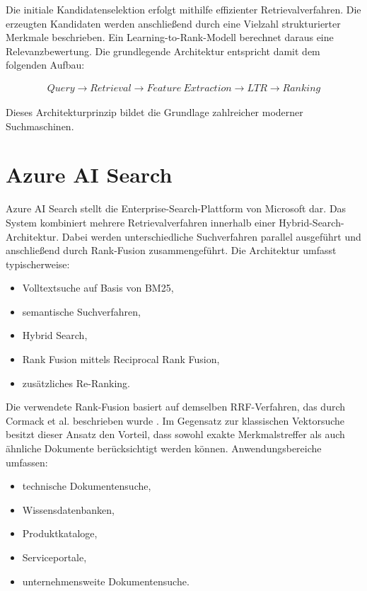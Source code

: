 Die initiale Kandidatenselektion erfolgt mithilfe effizienter Retrievalverfahren.
Die erzeugten Kandidaten werden anschließend durch eine Vielzahl strukturierter Merkmale beschrieben.
Ein Learning-to-Rank-Modell berechnet daraus eine Relevanzbewertung.
Die grundlegende Architektur entspricht damit dem folgenden Aufbau:

\begin{align}
  Query \rightarrow Retrieval \rightarrow Feature\ Extraction \rightarrow LTR \rightarrow Ranking
\end{align}

Dieses Architekturprinzip bildet die Grundlage zahlreicher moderner Suchmaschinen.

\section{Azure AI Search}

Azure AI Search stellt die Enterprise-Search-Plattform von Microsoft dar.
Das System kombiniert mehrere Retrievalverfahren innerhalb einer Hybrid-Search-Architektur.
Dabei werden unterschiedliche Suchverfahren parallel ausgeführt und anschließend durch Rank-Fusion zusammengeführt.
Die Architektur umfasst typischerweise:

\begin{itemize}
  \item Volltextsuche auf Basis von BM25,
  \item semantische Suchverfahren,
  \item Hybrid Search,
  \item Rank Fusion mittels Reciprocal Rank Fusion,
  \item zusätzliches Re-Ranking.
\end{itemize}

Die verwendete Rank-Fusion basiert auf demselben RRF-Verfahren, das durch Cormack et al. beschrieben wurde \cite{cormack2009rrf}.
Im Gegensatz zur klassischen Vektorsuche besitzt dieser Ansatz den Vorteil, dass sowohl exakte Merkmalstreffer als auch ähnliche Dokumente berücksichtigt werden können.
Anwendungsbereiche umfassen:

\begin{itemize}
  \item technische Dokumentensuche,
  \item Wissensdatenbanken,
  \item Produktkataloge,
  \item Serviceportale,
  \item unternehmensweite Dokumentensuche.
\end{itemize}

